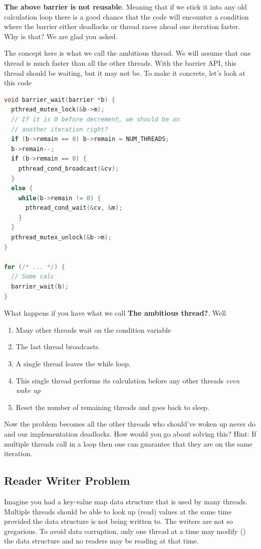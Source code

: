 \textbf{The above barrier is not reusable}.
Meaning that if we stick it into any old calculation loop there is a good chance that the code will encounter a condition where the barrier either deadlocks or thread races ahead one iteration faster.
Why is that?
We are glad you asked.

The concept here is what we call the ambitious thread.
We will assume that one thread is much faster than all the other threads.
With the barrier API, this thread should be waiting, but it may not be.
To make it concrete, let's look at this code

\begin{lstlisting}[language=C]
void barrier_wait(barrier *b) {
  pthread_mutex_lock(&b->m);
  // If it is 0 before decrement, we should be on
  // another iteration right?
  if (b->remain == 0) b->remain = NUM_THREADS;
  b->remain--;
  if (b->remain == 0) {
    pthread_cond_broadcast(&cv);
  }
  else {
    while(b->remain != 0) {
      pthread_cond_wait(&cv, &m);
    }
  }
  pthread_mutex_unlock(&b->m);
}

for (/* ... */) {
  // Some calc
  barrier_wait(b);
}
\end{lstlisting}

What happens if you have what we call \textbf{The ambitious thread?}. Well
\begin{enumerate}
\item Many other threads wait on the condition variable
\item The last thread broadcasts.
\item A single thread leaves the while loop.
\item This single thread performs its calculation before any other threads \textit{even wake up}
\item Reset the number of remaining threads and goes back to sleep.
\end{enumerate}

Now the problem becomes all the other threads who should've woken up never do and our implementation deadlocks.
How would you go about solving this?
Hint: If multiple threads call  in a loop then one can guarantee that they are on the same iteration.

\subsection{Reader Writer Problem}

Imagine you had a key-value map data structure that is used by many threads.
Multiple threads should be able to look up (read) values at the same time provided the data structure is not being written to.
The writers are not so gregarious.
To avoid data corruption, only one thread at a time may modify () the data structure and no readers may be reading at that time.


